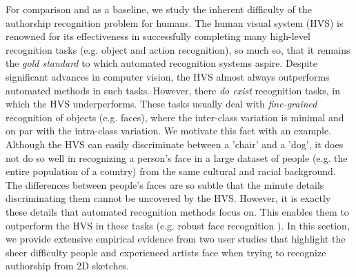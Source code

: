 For comparison and as a baseline, we study the inherent difficulty of the authorship recognition problem for humans. The human visual system (HVS) is renowned for its effectiveness in successfully completing many high-level recognition tasks (e.g. object and action recognition), so much so, that it remains the \emph{gold standard} to which automated recognition systems aspire. Despite significant advances in computer vision, the HVS almost always outperforms automated methods in such tasks. However, there \emph{do exist} recognition tasks, in which the HVS underperforms. These tasks usually deal with \emph{fine-grained} recognition of objects (e.g. faces), where the inter-class variation is minimal and on par with the intra-class variation. We motivate this fact with an example. Although the HVS can easily discriminate between a 'chair' and a 'dog', it does not do so well in recognizing a person's face in a large dataset of people (e.g. the entire population of a country) from the same cultural and racial background. The differences between people's faces are so subtle that the minute details discriminating them cannot be uncovered by the HVS. However, it is exactly these details that automated recognition methods focus on. This enables them to outperform the HVS in these tasks (e.g. robust face recognition \cite{4483511}). In this section, we provide extensive empirical evidence from two user studies that highlight the sheer difficulty people and experienced artists face when trying to recognize authorship from 2D sketches.%





